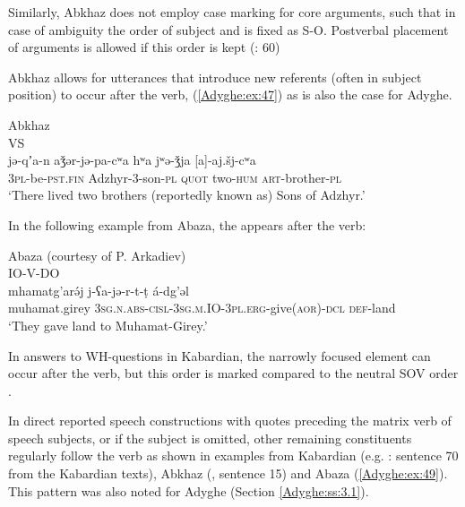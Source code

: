 \documentclass[output=paper,colorlinks,citecolor=brown, draft]{langscibook}
\begin{document}
Similarly, Abkhaz does not employ case marking for core arguments, such that in case of ambiguity the order of subject and  is fixed as S-O. Postverbal placement of arguments is allowed if this order is kept (\citealt{chirikba2003abkhaz}: 60)

Abkhaz allows for  utterances that introduce new referents (often in subject position) to occur after the verb, (\ref{Adyghe:ex:47}) as is also the case for Adyghe.

\ea\label{Adyghe:ex:47}
Abkhaz \citep[259]{chirikba2003evidential} \\
VS \\
\gll jə-qʼa-n aǯər-jə-pa-cʷa hʷa jʷə-ǯja [a]-aj.šj-cʷa \\
\textsc{3pl-}be\textsc{-pst.fin} Adzhyr-3-son\textsc{-pl} \textsc{quot} two\textsc{-hum} \textsc{art-}brother\textsc{-pl} \\
\glt `There lived two brothers (reportedly known as) Sons of Adzhyr.'
\z

In the following example from Abaza, the  appears after the verb:

\ea\label{Adyghe:ex:48}
Abaza (courtesy of P. Arkadiev) \\
IO-V-DO \\
\gll mhamatg'arə́j j-ʕa-jə-r-t-ṭ á-dg'əl\\
muhamat.girey \textsc{3sg.n.abs-cisl-3sg.m.IO-3pl.erg-}give\textsc{(aor)-dcl} \textsc{def-}land\\
\glt `They gave land to Muhamat-Girey.'
\z

In answers to WH-questions in Kabardian, the narrowly focused element can occur after the verb, but this order is marked compared to the neutral SOV order \citet[142]{kumakhov2009circassian}. 

In direct reported speech constructions with quotes preceding the matrix verb of speech subjects, or if the subject is omitted, other remaining constituents regularly follow the verb as shown in examples from Kabardian (e.g. \citealt{colarusso1999north}: sentence 70 from the Kabardian texts), Abkhaz (\citealt{chirikba2003abkhaz}, sentence 15) and Abaza (\ref{Adyghe:ex:49}). This pattern was also noted for Adyghe (Section \ref{Adyghe:ss:3.1}).
\end{document}
